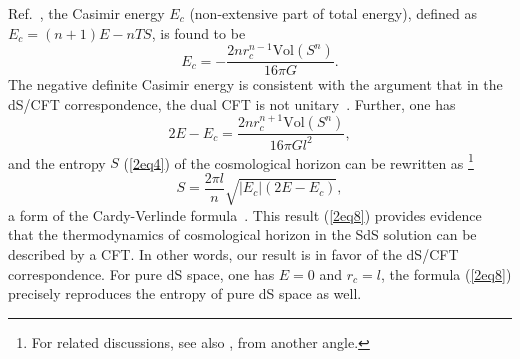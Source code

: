 \documentclass[a4paper,12pt]{article}
\begin{document}
Ref.~\cite{Verl}, the Casimir energy $E_c$ (non-extensive part of total energy), defined 
as $ E_c=(n+1)E-nTS$, is found to be~\cite{Cai1}
\begin{equation}
\label{2eq6}
E_c=-\frac{2nr_c^{n-1}\mbox{Vol}(S^n)}{16\pi G}.
\end{equation}
The negative definite Casimir energy is consistent with the argument that in the dS/CFT 
correspondence, the dual CFT is not unitary~\cite{Stron1}. Further, one has 
\begin{equation}
2E-E_c=\frac{2n r_c^{n+1}\mbox{Vol}(S^n)}{16\pi G l^2}, 
\end{equation}
and  the entropy $S$ (\ref{2eq4}) of the cosmological horizon can be rewritten 
as \cite{Cai1}\footnote{For related discussions, see also \cite{Dan,Halyo}, from another angle.}
\begin{equation}
\label{2eq8}
S=\frac{2\pi l}{n}\sqrt{|E_c|(2E-E_c)}, 
\end{equation}
a form of the Cardy-Verlinde formula~\cite{Verl}. This result (\ref{2eq8}) provides 
evidence that the thermodynamics of cosmological horizon in the SdS solution can be 
described by a CFT. In other words, our result is in favor of the dS/CFT 
correspondence. For pure dS space, one has $E=0$ and $r_c=l$, the formula (\ref{2eq8})
precisely reproduces the entropy of pure dS space as well. 
\end{document}
